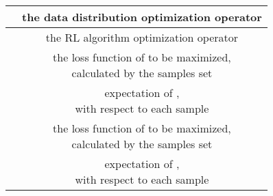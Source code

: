 \documentclass[nohyperref]{article}
\theoremstyle{plain}
\begin{document}
\begin{table}[!hb]
\begin{tabular}{|c |c| }
	    \hline
	     & the data distribution optimization operator \\
	    \hline
	     & the RL algorithm optimization operator \\
	    \hline
	     & \makecell[c]{the loss function of  to be maximized, \\ calculated by the samples set  }\\
	    \hline
	     & \makecell[c]{expectation of , \\ with respect to each sample } \\
	    \hline
	     & \makecell[c]{the loss function of  to be maximized,\\  calculated by the samples set } \\
	    \hline
	     & \makecell[c]{expectation of , \\ with respect to each sample } \\
		\hline
	\end{tabular} 
\end{table}
\end{document}
